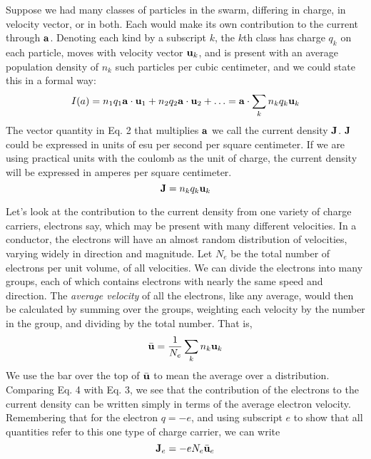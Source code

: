 Suppose we had many classes of particles in the swarm, differing
in charge, in velocity vector, or in both. Each would make its own
contribution to the current through $\mathbf{a}$. Denoting each kind by a subscript
$k$, the $k$th class has charge $q_k$ on each particle, moves with
velocity vector $\mathbf{u}_k$, and is present with an average population density
of $n_k$ such particles per cubic centimeter, and we could state this in a
formal way:
\begin{equation}
  I(a) = n_1q_1 \mathbf{a}\cdot\mathbf{u}_1+n_2q_2 \mathbf{a}\cdot\mathbf{u}_2+\ldots
         = \mathbf{a}\cdot\sum_k n_kq_k\mathbf{u}_k
\end{equation}
The vector quantity in Eq. 2 that multiplies $\mathbf{a}$ we call the current
density $\mathbf{J}$. $\mathbf{J}$ could be expressed in units of esu per second per square
centimeter. If we are using practical units with the coulomb as the
unit of charge, the current density will be expressed in amperes per
square centimeter.
\begin{equation}
  \mathbf{J} = n_kq_k\mathbf{u}_k
\end{equation}

Let's look at the contribution to the current density from one
variety of charge carriers, electrons say, which may be present with
many different velocities. In a conductor, the electrons will have
an almost random distribution of velocities, varying widely in direction
and magnitude. Let $N_e$ be the total number of electrons per
unit volume, of all velocities. We can divide the electrons into many
groups, each of which contains electrons with nearly the same speed
and direction. The \emph{average velocity} of all the electrons, like any
average, would then be calculated by summing over the groups,
weighting each velocity by the number in the group, and dividing by
the total number. That is,
\begin{equation}
  \bar{\mathbf{u}} = \frac{1}{N_e} \sum_k n_k\mathbf{u}_k
\end{equation}
We use the bar over the top of $\bar{\mathbf{u}}$ to mean the average over a distribution.
Comparing Eq. 4 with Eq. 3, we see that the contribution
of the electrons to the current density can be written simply in terms
of the average electron velocity. Remembering that for the electron
$q=-e$, and using subscript $e$ to show that all quantities refer to
this one type of charge carrier, we can write
\begin{equation}
  \mathbf{J}_e = -eN_e \bar{\mathbf{u}}_e
\end{equation}

